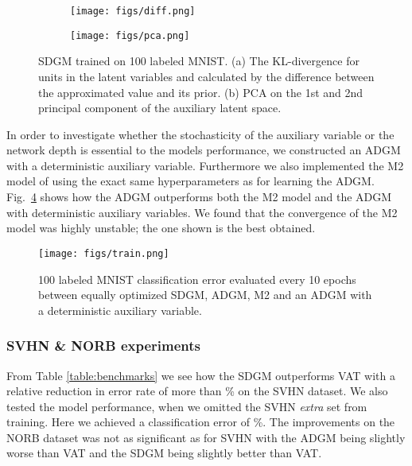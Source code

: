 \documentclass{article}
\begin{document}
\begin{figure}[h!]
\centering
\begin{subfigure}{.4\textwidth}
\centering
\texttt{[image: figs/diff.png]}
\caption{ }
\label{fig:kl}
\end{subfigure}
\begin{subfigure}{.4\textwidth}
\centering
\texttt{[image: figs/pca.png]}
\caption{ }
\label{fig:pca}
\end{subfigure}
 \vspace{-2mm}
\caption{SDGM trained on 100 labeled MNIST. (a) The KL-divergence for units in the latent variables  and  calculated by the difference between the approximated value and its prior. (b) PCA on the 1st and 2nd principal component of the auxiliary latent space.}
\end{figure}

In order to investigate whether the stochasticity of the auxiliary variable  or the network depth is essential to the models performance, we constructed an ADGM with a deterministic auxiliary variable. Furthermore we also implemented the M2 model of \citet{Kingma14} using the exact same hyperparameters as for learning the ADGM. Fig.~\ref{fig:curve} shows how the ADGM outperforms both the M2 model and the ADGM with deterministic auxiliary variables. We found that the convergence of the M2 model was highly unstable; the one shown is the best obtained.
\begin{figure}
\vspace{-3mm}
	  \centering
      \texttt{[image: figs/train.png]}
       \vspace{-3mm}
	  \caption{100 labeled MNIST classification error  evaluated every 10 epochs between equally optimized SDGM, ADGM, M2 \citep{Kingma14} and an ADGM with a deterministic auxiliary variable.}
	  \label{fig:curve}
      \vspace{-5mm}
\end{figure}



\subsubsection*{SVHN \& NORB experiments}
From Table \ref{table:benchmarks} we see how the SDGM outperforms VAT with a relative reduction in error rate of more than \% on the SVHN dataset. We also tested the model performance, when we omitted the SVHN \textit{extra} set from training. Here we achieved a classification error of \%. The improvements on the NORB dataset was not as significant as for SVHN with the ADGM being slightly worse than VAT and the SDGM being slightly better than VAT.
\end{document}
